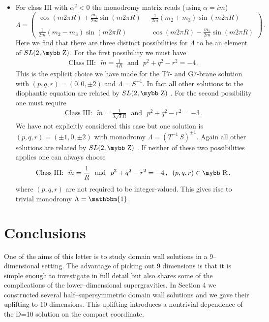 \documentclass[12pt,a4paper]{article}
\newcommand{\id}{\mathbbm{1}}
\def\bb#1{\hbox{\mybb#1}}
\begin{document}
\begin{itemize}
\item
For class III with $\alpha^2<0$ the monodromy matrix reads
(using $\alpha =i m$)
\begin{equation}
  \Lambda  = \left(
    \begin{array}{cc} \cos(m 2 \pi R) + \tfrac{m_1}{2m}
       \sin(m 2 \pi R) &
     \ \ \ \tfrac{1}{2 m} (m_2+m_3) \sin(m 2 \pi R) \\
        &\\
     \tfrac{1}{2 m} (m_2-m_3) \sin(m 2 \pi R) &
     \ \ \ \cos(m 2 \pi R) - \tfrac{m_1}{2m}
       \sin(m 2 \pi R) \end{array}
    \right) \,.
\end{equation}
%
Here we find that there are three distinct possibilities for $\Lambda$ to
be an element of $SL(2,\bb{Z})$. For the first possibility we must have
\begin{align}
  \text{Class III:~~} \tilde m = \frac{1}{4 R}
  \text{~~and~~} p^2+q^2-r^2=-4 \,.
\end{align}
%
This is the explicit choice we have made for the T7- and G7-brane solution
with $(p,q,r)=(0,0,\pm2)$ and $\Lambda=S^{\pm 1}$. In fact all other
solutions to the diophantic equation are related by $SL(2,\bb{Z})$
\cite{DeWolfe:1998eu, DeWolfe:1998pr,Hull:2002wg}. For the second possibility one must require
\begin{align}
  \text{Class III:~~} \tilde m = \frac{1}{3 \sqrt{3} R}
  \text{~~and~~} p^2+q^2-r^2=-3 \,.
\end{align}
We have not explicitly considered this case but one solution is
$(p,q,r)=(\pm1,0,\pm2)$ with monodromy $\Lambda=(T^{-1} \, S)^{\pm1}$.
Again all other solutions are related by $SL(2,\bb{Z})$
\cite{DeWolfe:1998eu, DeWolfe:1998pr,Hull:2002wg}.
If neither of these two possibilities applies one can always choose
\begin{align}
  \text{Class III:~~} \tilde m = \frac{1}{R}
  \text{~~and~~} p^2+q^2-r^2=-4 \,,  \; \; (p,q,r) \in \bb{R} \,,
\end{align}
where $(p,q,r)$ are not required to be integer-valued. This gives rise
to trivial monodromy $\Lambda=\id$.
\end{itemize}


\section{Conclusions}

One of the aims of this letter is to study domain wall solutions in a
9--dimensional setting. The advantage of picking out 9 dimensions is that
it is simple enough to investigate in full detail but also shares some of
the complications of the lower--dimensional supergravities. In Section 4
we constructed several half--supersymmetric domain wall solutions and we
gave their uplifting to 10 dimensions. This uplifting introduces a
nontrivial dependence of the D=10 solution on the compact coordinate.
\end{document}
